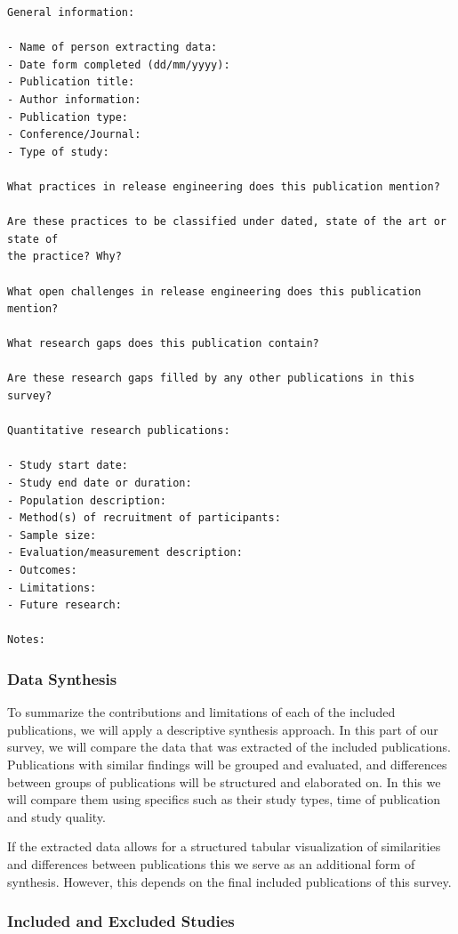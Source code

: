 \documentclass[]{book}
\begin{document}
\begin{verbatim}
General information:

- Name of person extracting data:
- Date form completed (dd/mm/yyyy):
- Publication title:
- Author information:
- Publication type:
- Conference/Journal:
- Type of study:

What practices in release engineering does this publication mention?

Are these practices to be classified under dated, state of the art or state of
the practice? Why?

What open challenges in release engineering does this publication mention?

What research gaps does this publication contain?

Are these research gaps filled by any other publications in this survey?

Quantitative research publications:

- Study start date:
- Study end date or duration:
- Population description:
- Method(s) of recruitment of participants:
- Sample size:
- Evaluation/measurement description:
- Outcomes:
- Limitations:
- Future research:

Notes:
\end{verbatim}

\subsubsection{Data Synthesis}\label{data-synthesis}

To summarize the contributions and limitations of each of the included
publications, we will apply a descriptive synthesis approach. In this
part of our survey, we will compare the data that was extracted of the
included publications. Publications with similar findings will be
grouped and evaluated, and differences between groups of publications
will be structured and elaborated on. In this we will compare them using
specifics such as their study types, time of publication and study
quality.

If the extracted data allows for a structured tabular visualization of
similarities and differences between publications this we serve as an
additional form of synthesis. However, this depends on the final
included publications of this survey.

\subsubsection{Included and Excluded
Studies}\label{included-and-excluded-studies}
\end{document}
